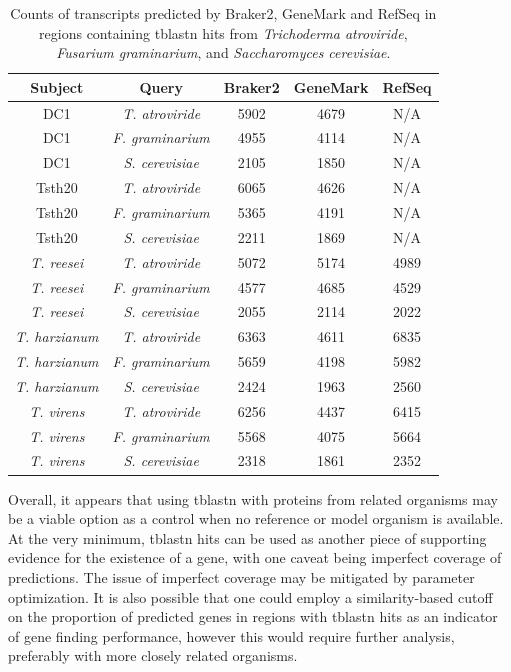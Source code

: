 \begin{table}
  \centering
  \begin{tabular}{|c|c|c|c|c|}
    \hline
    Subject & Query & Braker2 & GeneMark & RefSeq \\ \hline
    DC1 & \textit{T. atroviride} & 5902 & 4679 & N/A \\ \hline
    DC1 & \textit{F. graminarium} & 4955 & 4114 & N/A \\ \hline
    DC1 & \textit{S. cerevisiae} & 2105 & 1850 & N/A \\ \hline
    Tsth20 & \textit{T. atroviride} & 6065 & 4626 & N/A \\ \hline
    Tsth20 & \textit{F. graminarium} & 5365 & 4191 & N/A \\ \hline
    Tsth20 & \textit{S. cerevisiae} & 2211 & 1869 & N/A \\ \hline
    \textit{T. reesei} & \textit{T. atroviride} & 5072 & 5174 & 4989 \\ \hline
    \textit{T. reesei} & \textit{F. graminarium} & 4577 & 4685 & 4529 \\ \hline
    \textit{T. reesei} & \textit{S. cerevisiae} & 2055 & 2114 & 2022 \\ \hline
    \textit{T. harzianum} & \textit{T. atroviride} & 6363 & 4611 & 6835 \\ \hline
    \textit{T. harzianum} & \textit{F. graminarium} & 5659 & 4198 & 5982 \\ \hline
    \textit{T. harzianum} & \textit{S. cerevisiae} & 2424 & 1963 & 2560 \\ \hline
    \textit{T. virens} & \textit{T. atroviride} & 6256 & 4437 & 6415 \\ \hline
    \textit{T. virens} & \textit{F. graminarium} & 5568 & 4075 & 5664 \\ \hline
    \textit{T. virens} & \textit{S. cerevisiae} & 2318 & 1861 & 2352 \\ \hline
  \end{tabular}
  \caption[Counts of transcripts in regions with tblastn hits]{Counts of transcripts predicted by Braker2, GeneMark and
    RefSeq in regions containing tblastn hits from
    \textit{Trichoderma atroviride}, \textit{Fusarium graminarium},
    and \textit{Saccharomyces cerevisiae}.}\label{table:tblastn-genes}
\end{table}

Overall, it appears that using tblastn with proteins from related
organisms may be a viable option as a control when no reference or
model organism is available. At the very minimum, tblastn hits can be
used as another piece of supporting evidence for the existence of a
gene, with one caveat being imperfect coverage of predictions. The
issue of imperfect coverage may be mitigated by parameter
optimization. It is also possible that one could employ a
similarity-based cutoff on the proportion of predicted genes in
regions with tblastn hits as an indicator of gene finding performance,
however this would require further analysis, preferably with more
closely related organisms.
